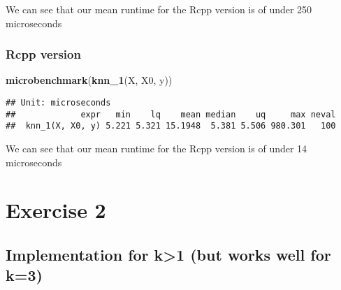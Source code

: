 \documentclass[]{article}
\newenvironment{Shaded}{\begin{snugshade}}{\end{snugshade}}
\newcommand{\KeywordTok}[1]{\textcolor[rgb]{0.13,0.29,0.53}{\textbf{#1}}}
\newcommand{\NormalTok}[1]{#1}
\begin{document}
We can see that our mean runtime for the Rcpp version is of under 250
microseconds

\hypertarget{rcpp-version}{%
\subsubsection{Rcpp version}\label{rcpp-version}}

\begin{Shaded}
\begin{Highlighting}[]
\KeywordTok{microbenchmark}\NormalTok{(}\KeywordTok{knn_1}\NormalTok{(X, X0, y))}
\end{Highlighting}
\end{Shaded}

\begin{verbatim}
## Unit: microseconds
##             expr   min    lq    mean median    uq     max neval
##  knn_1(X, X0, y) 5.221 5.321 15.1948  5.381 5.506 980.301   100
\end{verbatim}

We can see that our mean runtime for the Rcpp version is of under 14
microseconds

\newpage

\hypertarget{exercise-2}{%
\section{Exercise 2}\label{exercise-2}}

\hypertarget{implementation-for-k1-but-works-well-for-k3}{%
\subsection{Implementation for k\textgreater{}1 (but works well for
k=3)}\label{implementation-for-k1-but-works-well-for-k3}}
\end{document}

